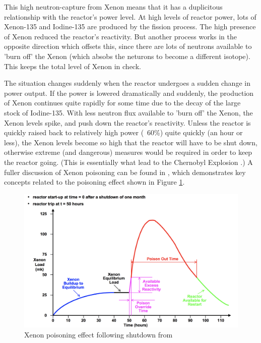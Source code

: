 \documentclass{article}\usepackage[]{graphicx}\usepackage[]{color}
\begin{document}
This high neutron-capture from Xenon means that it has a duplicitous relationship with the reactor's power level.  At high levels of reactor power, lots of Xenon-135 and Iodine-135 are produced by the fission process.  The high presence of Xenon reduced the reactor's reactivity.  But another process works in the opposite direction which offsets this, since there are lots of neutrons available to 'burn off' the Xenon (which absobs the neturons to become a different isotope).  This keeps the total level of Xenon in check.

The situation changes suddenly when the reactor undergoes a sudden change in power output.  If the power is lowered dramatically and suddenly, the production of Xenon continues quite rapidly for some time due to the decay of the large stock of Iodine-135.  With less neutron flux available to 'burn off' the Xenon, the Xenon levels spike, and push down the reactor's reactivity.  Unless the reactor is quickly raised back to relatively high power (~60\%) quite quickly (an hour or less), the Xenon levels become so high that the reactor will have to be shut down, otherwise extreme (and dangerous) measures would be required in order to keep the reactor going.  (This is essentially what lead to the Chernobyl Explosion \parencite{WNA2009}.)  A fuller discussion of Xenon poisoning can be found in \cite{garland2005}, which demonstrates key concepts related to the poisoning effect shown in Figure \ref{fig:XenonPoison.png}.

\begin{figure}
\includegraphics[width=\textwidth]{XenonPoison.png}
\caption{Xenon poisoning effect following shutdown from \parencite{garland2005}}
\label{fig:XenonPoison.png}
\end{figure}
\end{document}

